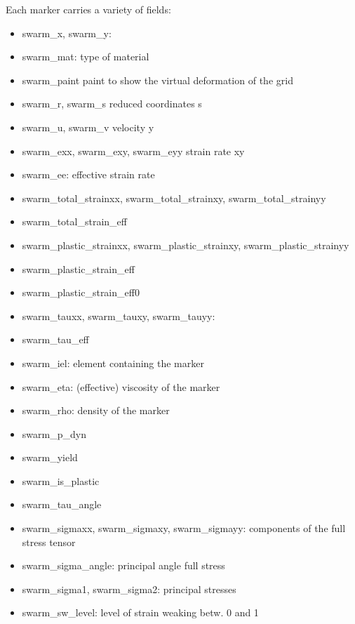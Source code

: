 \documentclass[a4paper]{article}
\newcommand{\python}{\color{darkgray} \sffamily }
\begin{document}
Each marker carries a variety of fields:
\begin{itemize}
\item {\python swarm\_x},{\python swarm\_y}:
\item {\python swarm\_mat}:  type of material 
\item {\python swarm\_paint}     paint to show the virtual deformation of the grid
\item {\python swarm\_r},{\python swarm\_s}         reduced coordinates s
\item {\python swarm\_u},{\python swarm\_v}         velocity y
\item {\python swarm\_exx},{\python swarm\_exy},{\python swarm\_eyy}  strain rate xy
\item {\python swarm\_ee}:        effective strain rate
\item {\python swarm\_total\_strainxx}, {\python swarm\_total\_strainxy}, {\python swarm\_total\_strainyy}
\item {\python swarm\_total\_strain\_eff}
\item {\python swarm\_plastic\_strainxx}, {\python swarm\_plastic\_strainxy}, {\python swarm\_plastic\_strainyy}
\item {\python swarm\_plastic\_strain\_eff}
\item {\python swarm\_plastic\_strain\_eff0}
\item {\python swarm\_tauxx}, {\python swarm\_tauxy}, {\python swarm\_tauyy}:
\item {\python swarm\_tau\_eff}
\item {\python swarm\_iel}: element containing the marker
\item {\python swarm\_eta}: (effective) viscosity of the marker
\item {\python swarm\_rho}: density of the marker
\item {\python swarm\_p\_dyn}
\item {\python swarm\_yield}
\item {\python swarm\_is\_plastic}
\item {\python swarm\_tau\_angle}
\item {\python swarm\_sigmaxx}, {\python swarm\_sigmaxy}, {\python swarm\_sigmayy}: components of the 
full stress tensor
\item {\python swarm\_sigma\_angle}: principal angle full stress
\item {\python swarm\_sigma1}, {\python swarm\_sigma2}: principal stresses
\item {\python swarm\_sw\_level}: level of strain weaking betw. 0 and 1
\end{itemize}
\end{document}
